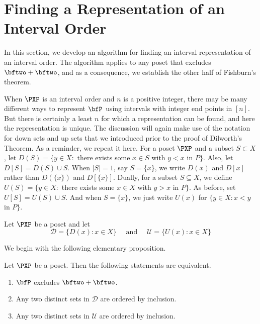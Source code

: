 \section{Finding a Representation of an Interval Order}
\label{s:posets:intervalorder:findrep}

In this section, we develop an algorithm for finding an interval
representation of an interval order.  The algorithm applies to
any poset that excludes $\bftwo+\bftwo$,
and as a consequence, we establish the other half of Fishburn's theorem.

When $\PXP$ is an interval order and $n$ is a positive integer, there
may be many different ways to represent $\bfP$ using intervals with
integer end points in $[n]$.  But there is certainly a least $n$ for
which a representation can be found, and here the representation is
unique.  The discussion will again make use of the notation for down
sets and up sets that we introduced prior to the proof of Dilworth's
Theorem. As a reminder, we repeat it here. For a poset $\PXP$ and a
subset $S\subset X$, let $D(S) = \{y\in X:$ there exists some $x\in S$
with $y<x$ in $P\}$.  Also, let $D[S]=D(S)\cup S$.  When $|S|=1$, say
$S=\{x\}$, we write $D(x)$ and $D[x]$ rather than $D(\{x\})$ and
$D[\{x\}]$.  Dually, for a subset $S\subseteq X$, we define $U(S) =
\{y\in X:$ there exists some $x\in X$ with $y>x$ in $P\}$.  As before,
set $U[S]=U(S)\cup S$.  And when $S=\{x\}$, we just write $U(x)$ for
$\{y\in X:x<y$ in $P\}$.

Let $\PXP$ be a poset and let
\[
\mathcal{D} = \{D(x):x\in X\}\quad\text{ and }\quad
\mathcal{U} = \{U(x):x\in X\}
\]

We begin with the following elementary proposition.

\begin{proposition}\label{prop:char-intord}
Let $\PXP$ be a poset.  Then the following statements
are equivalent.
\begin{enumerate}
\item $\bfP$ excludes $\bftwo+\bftwo$.
\item Any two distinct sets in $\mathcal{D}$ are ordered by inclusion.
\item Any two distinct sets in $\mathcal{U}$ are ordered by inclusion.
\end{enumerate}
\end{proposition}

